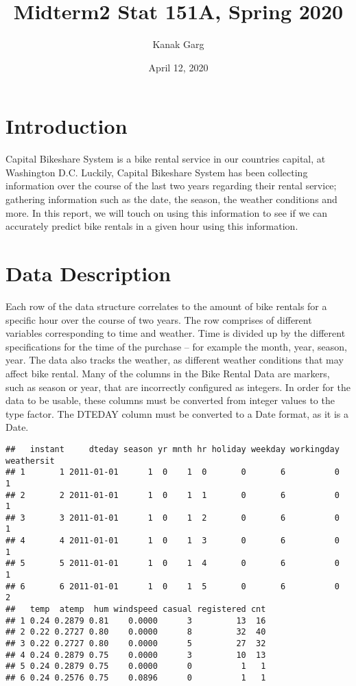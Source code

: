 \documentclass[]{article}
\title{Midterm2 Stat 151A, Spring 2020}
\author{Kanak Garg}
\date{April 12, 2020}
\begin{document}
\maketitle

\section{Introduction}\label{introduction}

Capital Bikeshare System is a bike rental service in our countries
capital, at Washington D.C. Luckily, Capital Bikeshare System has been
collecting information over the course of the last two years regarding
their rental service; gathering information such as the date, the
season, the weather conditions and more. In this report, we will touch
on using this information to see if we can accurately predict bike
rentals in a given hour using this information.

\section{Data Description}\label{data-description}

Each row of the data structure correlates to the amount of bike rentals
for a specific hour over the course of two years. The row comprises of
different variables corresponding to time and weather. Time is divided
up by the different specifications for the time of the purchase -- for
example the month, year, season, year. The data also tracks the weather,
as different weather conditions that may affect bike rental. Many of the
columns in the Bike Rental Data are markers, such as season or year,
that are incorrectly configured as integers. In order for the data to be
usable, these columns must be converted from integer values to the type
factor. The DTEDAY column must be converted to a Date format, as it is a
Date.

\begin{verbatim}
##   instant     dteday season yr mnth hr holiday weekday workingday weathersit
## 1       1 2011-01-01      1  0    1  0       0       6          0          1
## 2       2 2011-01-01      1  0    1  1       0       6          0          1
## 3       3 2011-01-01      1  0    1  2       0       6          0          1
## 4       4 2011-01-01      1  0    1  3       0       6          0          1
## 5       5 2011-01-01      1  0    1  4       0       6          0          1
## 6       6 2011-01-01      1  0    1  5       0       6          0          2
##   temp  atemp  hum windspeed casual registered cnt
## 1 0.24 0.2879 0.81    0.0000      3         13  16
## 2 0.22 0.2727 0.80    0.0000      8         32  40
## 3 0.22 0.2727 0.80    0.0000      5         27  32
## 4 0.24 0.2879 0.75    0.0000      3         10  13
## 5 0.24 0.2879 0.75    0.0000      0          1   1
## 6 0.24 0.2576 0.75    0.0896      0          1   1
\end{verbatim}
\end{document}
